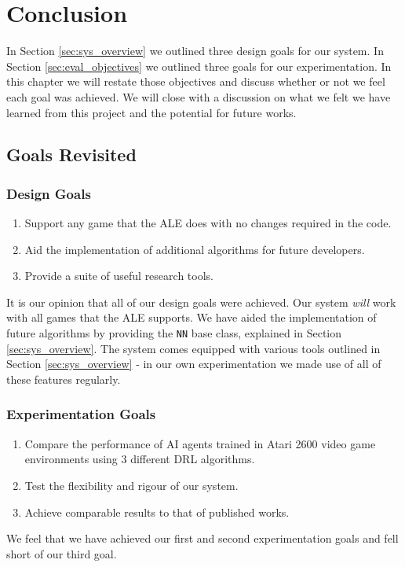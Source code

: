 \chapter{Conclusion}
In Section \ref{sec:sys_overview} we outlined three design goals for our system. In Section \ref{sec:eval_objectives} we outlined three goals for our experimentation. In this chapter we will restate those objectives and discuss whether or not we feel each goal was achieved. We will close with a discussion on what we felt we have learned from this project and the potential for future works.
\section{Goals Revisited}
\subsection{Design Goals}
\begin{enumerate}
	\item Support any game that the ALE does with no changes required in the code.
	\item Aid the implementation of additional algorithms for future developers.
	\item Provide a suite of useful research tools.
\end{enumerate}
It is our opinion that all of our design goals were achieved. Our system \textit{will} work with all games that the ALE supports. We have aided the implementation of future algorithms by providing the \texttt{NN} base class, explained in Section \ref{sec:sys_overview}. The system comes equipped with various tools outlined in Section \ref{sec:sys_overview} - in our own experimentation we made use of all of these features regularly.

\subsection{Experimentation Goals}
\begin{enumerate}
	\item Compare the performance of AI agents trained in Atari 2600 video game environments using 3 different DRL algorithms.
	\item Test the flexibility and rigour of our system.
	\item Achieve comparable results to that of published works.
\end{enumerate}
We feel that we have achieved our first and second experimentation goals and fell short of our third goal. \paragraph{}

